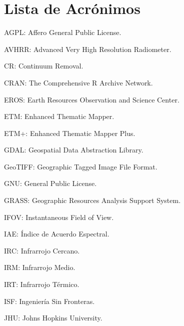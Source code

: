 


\chapter*{Lista de Acrónimos}

AGPL: Affero General Public License.

AVHRR: Advanced Very High Resolution Radiometer.

CR: Continuum Removal.

CRAN: The Comprehensive R Archive Network.

EROS: Earth Resources Observation and Science Center.

ETM: Enhanced Thematic Mapper.

ETM+: Enhanced Thematic Mapper Plus.

GDAL: Geospatial Data Abstraction Library.

GeoTIFF: Geographic Tagged Image File Format.

GNU: General Public License.

GRASS: Geographic Resources Analysis Support System.

IFOV: Instantaneous Field of View.

IAE: Índice de Acuerdo Espectral.

IRC: Infrarrojo Cercano.

IRM: Infrarrojo Medio.

IRT: Infrarrojo Térmico.

ISF: Ingeniería Sin Fronteras.

JHU: Johns Hopkins University.

